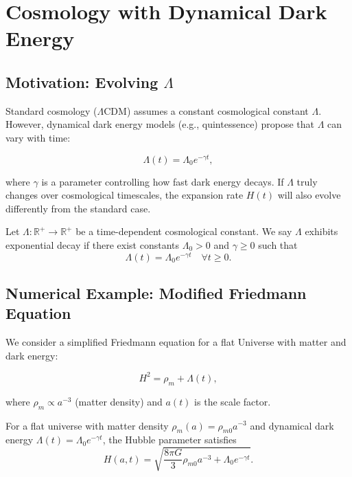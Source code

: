 \section{Cosmology with Dynamical Dark Energy}

\subsection{Motivation: Evolving $\Lambda$}

Standard cosmology ($\Lambda$CDM) assumes a constant cosmological constant $\Lambda$. However, dynamical dark energy models (e.g., quintessence) propose that $\Lambda$ can vary with time:

\begin{equation}
\Lambda(t) = \Lambda_0 e^{-\gamma t},
\label{eq:lambda_decay}
\end{equation}

where $\gamma$ is a parameter controlling how fast dark energy decays. If $\Lambda$ truly changes over cosmological timescales, the expansion rate $H(t)$ will also evolve differently from the standard case.

\begin{definition}
Let $\Lambda: \mathbb{R}^+ \to \mathbb{R}^+$ be a time-dependent cosmological constant. We say $\Lambda$ exhibits exponential decay if there exist constants $\Lambda_0 > 0$ and $\gamma \geq 0$ such that
\[
\Lambda(t) = \Lambda_0 e^{-\gamma t} \quad \forall t \geq 0.
\]
\end{definition}

\subsection{Numerical Example: Modified Friedmann Equation}

We consider a simplified Friedmann equation for a flat Universe with matter and dark energy:

\begin{equation}
H^2 = \rho_m + \Lambda(t),
\label{eq:friedmann_simplified}
\end{equation}

where $\rho_m \propto a^{-3}$ (matter density) and $a(t)$ is the scale factor.

\begin{theorem}
For a flat universe with matter density $\rho_m(a) = \rho_{m0} a^{-3}$ and dynamical dark energy $\Lambda(t) = \Lambda_0 e^{-\gamma t}$, the Hubble parameter satisfies
\[
H(a,t) = \sqrt{\frac{8\pi G}{3} \rho_{m0} a^{-3} + \Lambda_0 e^{-\gamma t}}.
\]
\end{theorem}

